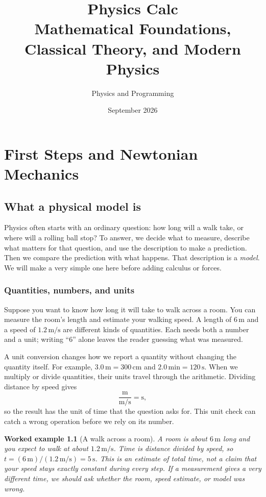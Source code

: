 \documentclass[11pt,oneside]{book}
\title{Physics Calc\\\large Mathematical Foundations, Classical Theory, and Modern Physics}
\author{Physics and Programming}
\date{September 2026}
\theoremstyle{reviewstyle}
\newtheorem{example}{Worked example}[chapter]
\begin{document}
\frontmatter
\hypersetup{pageanchor=false}
\maketitle
\hypersetup{pageanchor=true}
\tableofcontents

\mainmatter
\part{First Steps and Newtonian Mechanics}
\chapter{What a physical model is}
Physics often starts with an ordinary question: how long will a walk take, or where will a rolling ball stop? To answer, we decide what to measure, describe what matters for that question, and use the description to make a prediction. Then we compare the prediction with what happens. That description is a \emph{model}. We will make a very simple one here before adding calculus or forces.

\section{Quantities, numbers, and units}
Suppose you want to know how long it will take to walk across a room. You can measure the room's length and estimate your walking speed. A length of $6\,\mathrm m$ and a speed of $1.2\,\mathrm{m/s}$ are different kinds of quantities. Each needs both a number and a unit; writing ``6'' alone leaves the reader guessing what was measured.

A unit conversion changes how we report a quantity without changing the quantity itself. For example, $3.0\,\mathrm m=300\,\mathrm{cm}$ and $2.0\,\mathrm{min}=120\,\mathrm s$. When we multiply or divide quantities, their units travel through the arithmetic. Dividing distance by speed gives
\begin{equation}
\frac{\mathrm m}{\mathrm{m/s}}=\mathrm s,
\end{equation}
so the result has the unit of time that the question asks for. This unit check can catch a wrong operation before we rely on its number.

\begin{example}[A walk across a room]
A room is about $6\,\mathrm m$ long and you expect to walk at about $1.2\,\mathrm{m/s}$. Time is distance divided by speed, so $t=(6\,\mathrm m)/(1.2\,\mathrm{m/s})=5\,\mathrm s$. This is an estimate of total time, not a claim that your speed stays exactly constant during every step. If a measurement gives a very different time, we should ask whether the room, speed estimate, or model was wrong.
\end{example}
\end{document}

